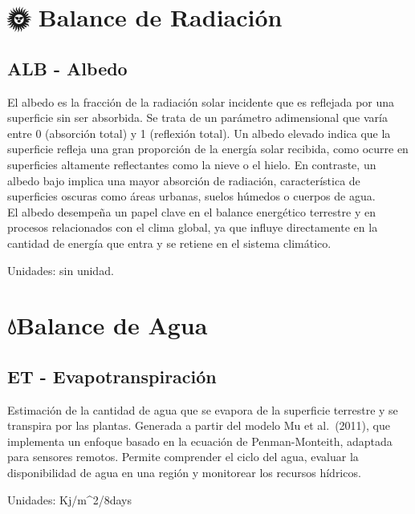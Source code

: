 \documentclass[
]{book}
\begin{document}
\section{\texorpdfstring{\textbf{🌞 Balance de Radiación}}{🌞 Balance de Radiación}}\label{balance-de-radiaciuxf3n}

\subsection{\texorpdfstring{\textbf{ALB} - Albedo}{ALB - Albedo}}\label{alb---albedo}

El albedo es la fracción de la radiación solar incidente que es reflejada por una superficie sin ser absorbida. Se trata de un parámetro adimensional que varía entre 0 (absorción total) y 1 (reflexión total). Un albedo elevado indica que la superficie refleja una gran proporción de la energía solar recibida, como ocurre en superficies altamente reflectantes como la nieve o el hielo. En contraste, un albedo bajo implica una mayor absorción de radiación, característica de superficies oscuras como áreas urbanas, suelos húmedos o cuerpos de agua.\\
El albedo desempeña un papel clave en el balance energético terrestre y en procesos relacionados con el clima global, ya que influye directamente en la cantidad de energía que entra y se retiene en el sistema climático.

Unidades: sin unidad.

\section{\texorpdfstring{\textbf{💧Balance de Agua}}{💧Balance de Agua}}\label{balance-de-agua}

\subsection{\texorpdfstring{\textbf{ET} - Evapotranspiración}{ET - Evapotranspiración}}\label{et---evapotranspiraciuxf3n}

Estimación de la cantidad de agua que se evapora de la superficie terrestre y se transpira por las plantas. Generada a partir del modelo Mu et al.~(2011), que implementa un enfoque basado en la ecuación de Penman-Monteith, adaptada para sensores remotos. Permite comprender el ciclo del agua, evaluar la disponibilidad de agua en una región y monitorear los recursos hídricos.

Unidades: Kj/m\^{}2/8days
\end{document}
